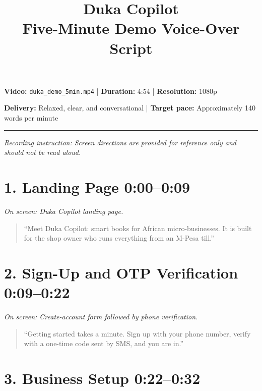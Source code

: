 \documentclass[11pt,a4paper]{article}
\title{
    \vspace{-1.5cm}
    {\Huge\bfseries Duka Copilot}\\[0.4em]
    {\Large Five-Minute Demo Voice-Over Script}
}
\author{}
\date{}
\newcommand{\timestamp}[1]{%
  \textcolor{dukablue}{\textbf{#1}}%
}
\newcommand{\screen}[1]{%
  \par\textit{\textcolor{mutedgray}{On screen: #1}}\par
}
\newcommand{\narration}[1]{%
  \begin{quote}
    \smallskip
    ``#1''
    \smallskip
  \end{quote}
}
\begin{document}
\maketitle

\begin{center}
    \textcolor{mutedgray}{
        \textbf{Video:} \texttt{duka\_demo\_5min.mp4}
        \quad | \quad
        \textbf{Duration:} 4:54
        \quad | \quad
        \textbf{Resolution:} 1080p
    }

    \textcolor{mutedgray}{
        \textbf{Delivery:} Relaxed, clear, and conversational
        \quad | \quad
        \textbf{Target pace:} Approximately 140 words per minute
    }
\end{center}

\vspace{0.5em}
\hrule
\vspace{0.5em}

\textit{Recording instruction: Screen directions are provided for
reference only and should not be read aloud.}

\section*{1. Landing Page \hfill
\small \timestamp{0:00--0:09}}

\screen{Duka Copilot landing page.}

\narration{Meet Duka Copilot: smart books for African
micro-businesses. It is built for the shop owner who runs
everything from an M-Pesa till.}

\section*{2. Sign-Up and OTP Verification \hfill
\small \timestamp{0:09--0:22}}

\screen{Create-account form followed by phone verification.}

\narration{Getting started takes a minute. Sign up with your
phone number, verify with a one-time code sent by SMS, and
you are in.}

\section*{3. Business Setup \hfill
\small \timestamp{0:22--0:32}}
\end{document}
